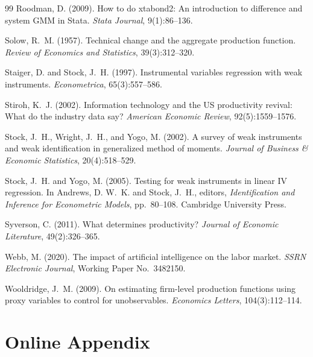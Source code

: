 \documentclass[11pt,a4paper]{article}
\begin{document}
\begin{thebibliography}{99}
Roodman, D. (2009).
\newblock How to do xtabond2: An introduction to difference and system GMM in Stata.
\newblock \emph{Stata Journal}, 9(1):86--136.

Solow, R.~M. (1957).
\newblock Technical change and the aggregate production function.
\newblock \emph{Review of Economics and Statistics}, 39(3):312--320.

Staiger, D. and Stock, J.~H. (1997).
\newblock Instrumental variables regression with weak instruments.
\newblock \emph{Econometrica}, 65(3):557--586.

Stiroh, K.~J. (2002).
\newblock Information technology and the US productivity revival: What do the industry data say?
\newblock \emph{American Economic Review}, 92(5):1559--1576.

Stock, J.~H., Wright, J.~H., and Yogo, M. (2002).
\newblock A survey of weak instruments and weak identification in generalized method of moments.
\newblock \emph{Journal of Business \& Economic Statistics}, 20(4):518--529.

Stock, J.~H. and Yogo, M. (2005).
\newblock Testing for weak instruments in linear IV regression.
\newblock In Andrews, D. W.~K. and Stock, J.~H., editors, \emph{Identification and Inference for Econometric Models}, pp.~80--108. Cambridge University Press.

Syverson, C. (2011).
\newblock What determines productivity?
\newblock \emph{Journal of Economic Literature}, 49(2):326--365.

Webb, M. (2020).
\newblock The impact of artificial intelligence on the labor market.
\newblock \emph{SSRN Electronic Journal}, Working Paper No.~3482150.

Wooldridge, J.~M. (2009).
\newblock On estimating firm-level production functions using proxy variables to control for unobservables.
\newblock \emph{Economics Letters}, 104(3):112--114.

\end{thebibliography}

\clearpage
\appendix
\section*{Online Appendix}
\label{sec:appendix}
\renewcommand{\thesection}{A}
\setcounter{table}{0}
\renewcommand{\thetable}{A\arabic{table}}
\setcounter{figure}{0}
\renewcommand{\thefigure}{A\arabic{figure}}
\end{document}
